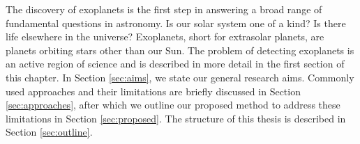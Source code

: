 

The discovery of exoplanets is the first step in answering a broad range of fundamental questions in astronomy. Is our solar system one of a kind? Is there life elsewhere in the universe? Exoplanets, short for extrasolar planets, are planets orbiting stars other than our Sun.
The problem of detecting exoplanets is an active region of science and is described in more detail in the first section of this chapter. In Section \ref{sec:aims}, we state our general research aims. Commonly used approaches and their limitations are briefly discussed in Section \ref{sec:approaches}, after which we outline our proposed method to address these limitations in Section \ref{sec:proposed}. The structure of this thesis is described in Section \ref{sec:outline}.